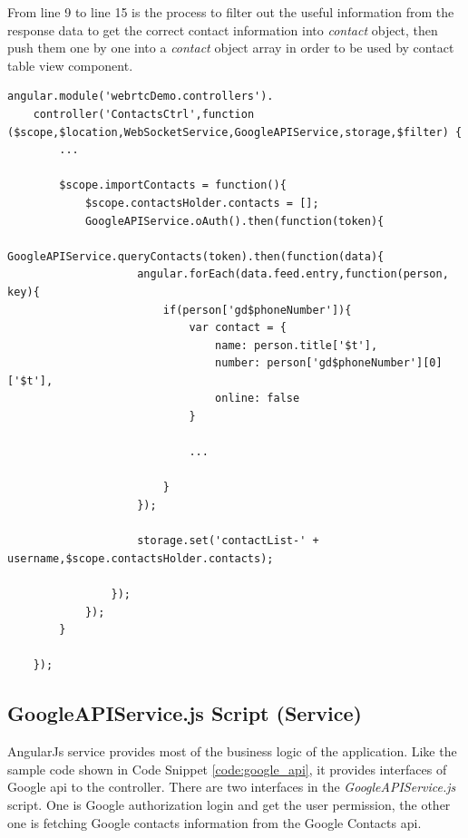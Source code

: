 \par From line 9 to line 15 is the process to filter out the useful information from the response data to get the correct contact information into \textit{contact} object, then push them one by one into a \textit{contact} object array in order to be used by contact table view component.

\begin{lstlisting}[caption={ContactsCtrl.js in application client},label={code:contact_ctrl}]
angular.module('webrtcDemo.controllers').
	controller('ContactsCtrl',function ($scope,$location,WebSocketService,GoogleAPIService,storage,$filter) {
		...
		
		$scope.importContacts = function(){
			$scope.contactsHolder.contacts = [];
			GoogleAPIService.oAuth().then(function(token){
				GoogleAPIService.queryContacts(token).then(function(data){
					angular.forEach(data.feed.entry,function(person, key){
						if(person['gd$phoneNumber']){
							var contact = {
								name: person.title['$t'],
								number: person['gd$phoneNumber'][0]['$t'],
								online: false
							}

							...

						}
					});

					storage.set('contactList-' + username,$scope.contactsHolder.contacts);

				});
			});
		}

	});
\end{lstlisting}


\subsection{GoogleAPIService.js Script (Service)}

\par AngularJs service provides most of the business logic of the application. Like the sample code shown in Code Snippet \ref{code:google_api}, it provides interfaces of Google \gls{api} to the controller. There are two interfaces in the \textit{GoogleAPIService.js} script. One is Google authorization login and get the user permission, the other one is fetching Google contacts information from the Google Contacts \gls{api}.


